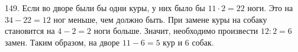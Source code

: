 149. Если во дворе были бы одни куры, у них было бы $11\cdot2=22$ ноги. Это на $34-22=12$ ног меньше, чем должно быть. При замене куры на собаку становится на $4-2=2$ ноги больше. Значит, необходимо произвести $12:2=6$ замен. Таким образом, на дворе $11-6=5$ кур и 6 собак.\\
